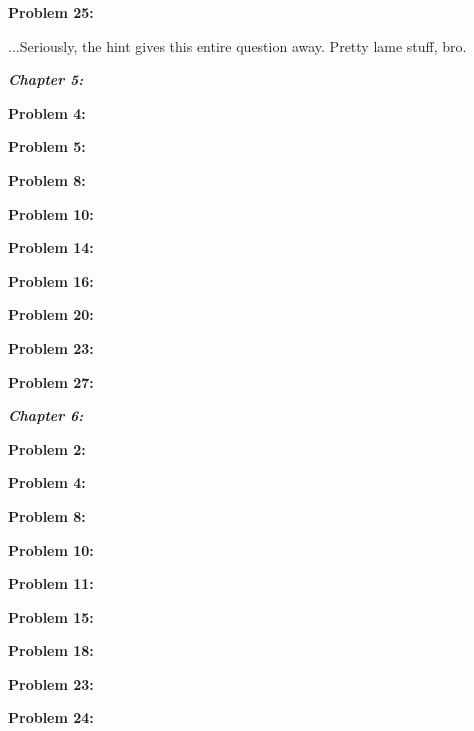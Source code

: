 \documentclass[a4paper,12pt]{article}
\begin{document}
\shunt

{\bf Problem 25:}

...Seriously, the hint gives this entire question away. Pretty lame stuff, bro.

\pagebreak

{\Huge{\textit{\textbf{Chapter 5:}}}}

\shunt

{\bf Problem 4:}

\shunt

{\bf Problem 5:}

\shunt

{\bf Problem 8:}

\shunt

{\bf Problem 10:}

\shunt

{\bf Problem 14:}

\shunt

{\bf Problem 16:}

\shunt

{\bf Problem 20:}

\shunt

{\bf Problem 23:}

\shunt

{\bf Problem 27:}

\pagebreak

{\Huge{\textit{\textbf{Chapter 6:}}}}

\shunt

{\bf Problem 2:}

\shunt

{\bf Problem 4:}

\shunt

{\bf Problem 8:}

\shunt

{\bf Problem 10:}

\shunt

{\bf Problem 11:}

\shunt

{\bf Problem 15:}

\shunt

{\bf Problem 18:}

\shunt

{\bf Problem 23:}

\shunt

{\bf Problem 24:}

\shunt
\end{document}
